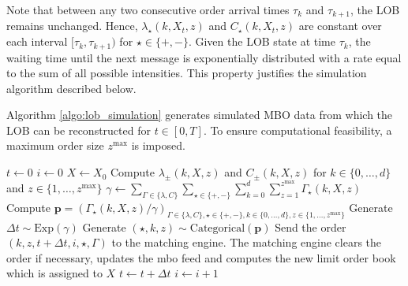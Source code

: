 \documentclass[10pt,a4paper,oneside]{article}
\providecommand{\DIFaddbegin}{} %
\providecommand{\DIFaddend}{} %
\providecommand{\DIFdelbegin}{} %
\providecommand{\DIFdelend}{} %
\newcommand{\DIFscaledelfig}{0.5}
\newlength{\DIFdelgraphicswidth} %
\newlength{\DIFdelgraphicsheight} %
\newcommand{\DIFaddincludegraphics}[2][]{{\color{blue}\fbox{\DIFOincludegraphics[#1]{#2}}}} %
\newcommand{\DIFdelincludegraphics}[2][]{%
\sbox{\DIFdelgraphicsbox}{\DIFOincludegraphics[#1]{#2}}%
\settoboxwidth{\DIFdelgraphicswidth}{\DIFdelgraphicsbox} %
\settoboxtotalheight{\DIFdelgraphicsheight}{\DIFdelgraphicsbox} %
\scalebox{\DIFscaledelfig}{%
\parbox[b]{\DIFdelgraphicswidth}{\usebox{\DIFdelgraphicsbox}\\[-\baselineskip] \rule{\DIFdelgraphicswidth}{0em}}\llap{\resizebox{\DIFdelgraphicswidth}{\DIFdelgraphicsheight}{%
\setlength{\unitlength}{\DIFdelgraphicswidth}%
\begin{picture}(1,1)%
\thicklines\linethickness{2pt} %
{\color[rgb]{1,0,0}\put(0,0){\framebox(1,1){}}}%
{\color[rgb]{1,0,0}\put(0,0){\line( 1,1){1}}}%
{\color[rgb]{1,0,0}\put(0,1){\line(1,-1){1}}}%
\end{picture}%
}\hspace*{3pt}}} %
} %
\DeclareRobustCommand{\DIFaddbegin}{\DIFOaddbegin \let\includegraphics\DIFaddincludegraphics} %
\DeclareRobustCommand{\DIFaddend}{\DIFOaddend \let\includegraphics\DIFOincludegraphics} %
\DeclareRobustCommand{\DIFdelbegin}{\DIFOdelbegin \let\includegraphics\DIFdelincludegraphics} %
\DeclareRobustCommand{\DIFdelend}{\DIFOaddend \let\includegraphics\DIFOincludegraphics} %
\begin{document}
Note that between any two consecutive order arrival times $\tau_k$ and $\tau_{k+1}$, the LOB remains unchanged. Hence, $\lambda_{\star}(k, X_t, z)$ and $C_{\star}(k, X_t, z)$ are constant over each interval $[\tau_k, \tau_{k+1})$ for $\star \in \{+, -\}$. Given the LOB state at time $\tau_k$, the waiting time until the next message is exponentially distributed with a rate equal to the sum of all possible intensities. This property justifies the simulation algorithm described below.

Algorithm \ref{algo:lob_simulation} generates simulated MBO data from which the LOB can be reconstructed for $t \in [0,T]$. To ensure computational feasibility, a maximum order size $z^{\max}$ is imposed.


\begin{algorithm}[H]
    \caption{Limit Order Book Simulation Algorithm}
    \label{algo:lob_simulation}
    \begin{algorithmic}
        \DIFdelbegin %
\DIFdelend \DIFaddbegin {}
        \DIFaddend \State $t \gets 0$
        \State $i \gets 0$
        \State $X \gets X_0$
        \State Compute $\lambda_{\pm}(k, X, z)$ and $C_{\pm}(k, X, z)$ for $k \in \{0 , \dots, d \}$ and $z \in \{ 1, \dots, z^{\max} \}$
        \State $\gamma \gets \sum_{\Gamma \in \{ \lambda, C \}} \sum_{\star \in \{+, - \}} \sum^{d}_{k = 0} \sum^{z^{\max}}_{z = 1} \Gamma_{\star}(k, X, z)$
        \State Compute $\mathbf{p} = \left(\Gamma_{\star}(k, X, z) / \gamma\right)_{\Gamma \in \{ \lambda, C \}, \star \in \{+, -\}, k \in \{ 0, \dots, d \}, z \in \{1, \dots, z^{\max} \} }$
        \State Generate $\Delta t \sim \text{Exp}(\gamma)$
        \State Generate $(\star, k, z) \sim \text{Categorical}(\mathbf{p})$
        \State Send the order $(k, z, t + \Delta t, i, \star, \Gamma)$ to the matching engine.
        \State The matching engine clears the order if necessary, updates the mbo feed and computes the new limit order book which is assigned to $X$
        \State $t \gets t + \Delta t$
        \State $i \gets i + 1$
        \EndWhile
    \end{algorithmic}
\end{algorithm}
\end{document}
